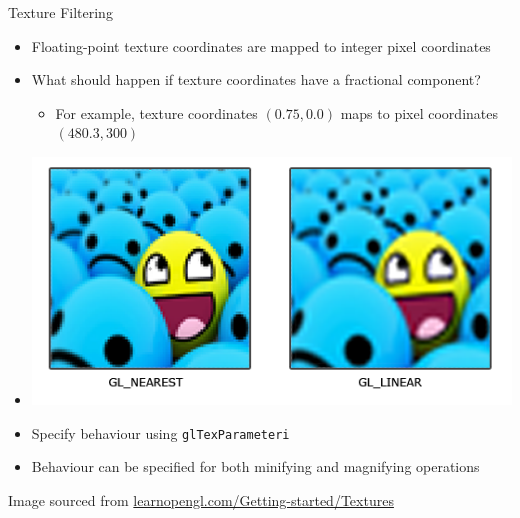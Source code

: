 \documentclass{beamer}
\begin{document}
\begin{frame}[fragile]{Texture Filtering}
    \begin{itemize}
        \item Floating-point texture coordinates are mapped to integer pixel coordinates
        \item What should happen if texture coordinates have a fractional component?
        \begin{itemize}
            \item For example, texture coordinates $\left(0.75, 0.0\right)$ maps to pixel coordinates 
                $\left(480.3, 300\right)$
        \end{itemize}
        \item[] \begin{center}\includegraphics[width=0.40\textheight]{images/texture_filtering.png}\end{center}
        \item Specify behaviour using {\color{blue}\verb"glTexParameteri"}
        \item Behaviour can be specified for both minifying and magnifying operations
    \end{itemize}
    \vfill{}
    {\footnotesize{Image sourced from \url{learnopengl.com/Getting-started/Textures}}}
\end{frame}
\end{document}
